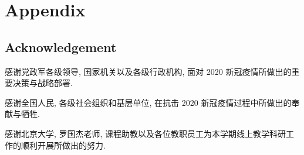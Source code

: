 \clearpage
\newpage
{} %
\appendix
  \renewcommand{\appendixname}{Appendix~\Alph{section}}
    \chapter{Appendix}
    \section[Acknowledgement]{Acknowledgement}
    感谢党政军各级领导, 国家机关以及各级行政机构, 面对 2020 新冠疫情所做出的重要决策与战略部署.

    \vspace{5ex}
    感谢全国人民, 各级社会组织和基层单位, 在抗击 2020 新冠疫情过程中所做出的奉献与牺牲.
    
    \vspace{5ex}
    感谢北京大学, 罗国杰老师, 课程助教以及各位教职员工为本学期线上教学科研工作的顺利开展所做出的努力.


